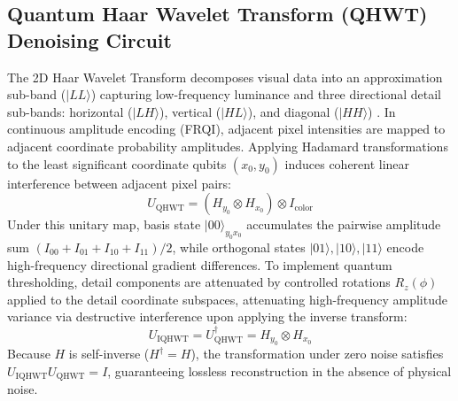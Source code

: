 \documentclass[12pt,onecolumn,draftclsnofoot]{IEEEtran}
\begin{document}
\subsection{Quantum Haar Wavelet Transform (QHWT) Denoising Circuit}
The 2D Haar Wavelet Transform decomposes visual data into an approximation sub-band ($|LL\rangle$) capturing low-frequency luminance and three directional detail sub-bands: horizontal ($|LH\rangle$), vertical ($|HL\rangle$), and diagonal ($|HH\rangle$) \cite{jiang2015quantum}. In continuous amplitude encoding (FRQI), adjacent pixel intensities are mapped to adjacent coordinate probability amplitudes. Applying Hadamard transformations to the least significant coordinate qubits $(x_0, y_0)$ induces coherent linear interference between adjacent pixel pairs:
\begin{equation}
U_{\text{QHWT}} = (H_{y_0} \otimes H_{x_0}) \otimes I_{\text{color}}
\end{equation}
Under this unitary map, basis state $|00\rangle_{y_0 x_0}$ accumulates the pairwise amplitude sum $(I_{00} + I_{01} + I_{10} + I_{11})/2$, while orthogonal states $|01\rangle, |10\rangle, |11\rangle$ encode high-frequency directional gradient differences. To implement quantum thresholding, detail components are attenuated by controlled rotations $R_z(\phi)$ applied to the detail coordinate subspaces, attenuating high-frequency amplitude variance via destructive interference upon applying the inverse transform:
\begin{equation}
U_{\text{IQHWT}} = U_{\text{QHWT}}^\dagger = H_{y_0} \otimes H_{x_0}
\end{equation}
Because $H$ is self-inverse ($H^\dagger = H$), the transformation under zero noise satisfies $U_{\text{IQHWT}} U_{\text{QHWT}} = I$, guaranteeing lossless reconstruction in the absence of physical noise.
\end{document}
